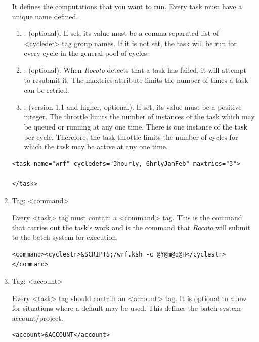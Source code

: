 \documentclass[11pt,fleqn]{report}              %
\begin{document}
\begin{enumerate}
It defines the computations that you want to run. Every task must have a unique name defined.

\begin{enumerate}
\item {: (optional). If set, its value must be a comma separated list of <cycledef> tag group names. If it is not set, the task will be run for every cycle in the general pool of cycles. }
\item {:  (optional). When {\it Rocoto} detects that a task has failed, it will attempt to resubmit it. The maxtries attribute limits the number of times a task can be retried.}
\item {: (version 1.1 and higher, optional). If set, its value must be a positive integer. The throttle limits the number of instances of the task which may be queued or running at any one time. There is one instance of the task per cycle. Therefore, the task throttle limits the number of cycles for which the task may be active at any one time. }

\end{enumerate}

\lstset{language=XML}   
\begin{lstlisting}[frame=trBL]
<task name="wrf" cycledefs="3hourly, 6hrlyJanFeb" maxtries="3">

</task>
\end{lstlisting}


\item Tag: <command>

Every <task> tag must contain a <command> tag. This is the command that carries out the task's work and is the command that {\it Rocoto} will submit to the batch system for execution.

\lstset{language=XML}   
\begin{lstlisting}[frame=trBL]
<command><cyclestr>&SCRIPTS;/wrf.ksh -c @Y@m@d@H</cyclestr></command>
\end{lstlisting}

\item Tag: <account>

Every <task> tag should contain an <account> tag. It is optional to allow for situations where a default may be used.
This defines the batch system account/project.
\lstset{language=XML}   
\begin{lstlisting}[frame=trBL]
<account>&ACCOUNT</account>
\end{lstlisting}


\end{enumerate}
\end{document}
